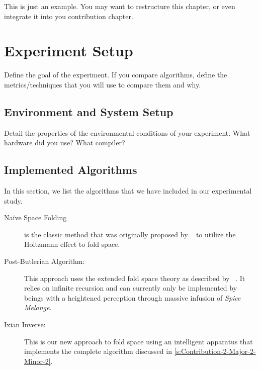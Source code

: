 
This is just an example. You may want to restructure this chapter, or even integrate it into you contribution chapter. 

\section{Experiment Setup}
\label{s:Experiment-Setup}

Define the goal of the experiment. If you compare algorithms, define the metrics/techniques that you will use to compare them and why.


\subsection{Environment and System Setup}
\label{s:Experiment-Env}

Detail the properties of the environmental conditions of your experiment. What hardware did you use? What compiler?


\subsection{Implemented Algorithms}
\label{s:Experiment-Algo}


In this section, we list the algorithms that we have included in our experimental study.

\begin{description}
  \item[Na\"{i}ve Space Folding] is the classic method that was originally proposed by \citeauthor{HerbertF:1965:Dune}~\cite{HerbertF:1965:Dune} to utilize the Holtzmann effect to fold space.
  
  \item[Post-Butlerian Algorithm:] This approach uses the extended fold space theory as described by \citeauthor{HerbertB:2002:Butlerian-Jihad}~\cite{HerbertB:2002:Butlerian-Jihad}. It relies on infinite recursion and can currently only be implemented by beings with a heightened perception through massive infusion of \emph{Spice Melange}.

  \item[Ixian Inverse:] This is our new approach to fold space using an intelligent apparatus that implements the complete algorithm discussed in \autoref{s:Contribution-2-Major-2-Minor-2}.

\end{description}


